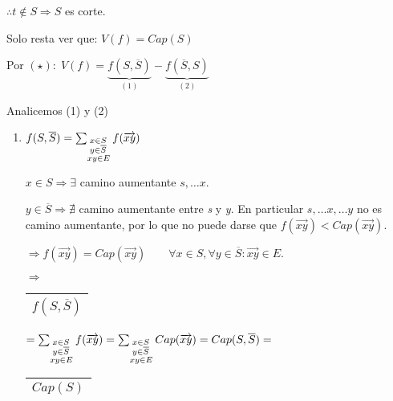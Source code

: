\documentclass[12pt,a4paper]{report}
\begin{document}
				$\therefore t \notin S \Rightarrow S$ es corte.
				
				\begin{center}
					Solo resta ver que: $V(f) = Cap(S)$
				\end{center}
				
				Por $(\star): \; V(f) =  \underbrace{f(S, \overline{S})}_{(1)} - \underbrace{f(\overline{S}, S)}_{(2)}$
				
				\vspace{2mm}
				Analicemos (1) y (2)
			\begin{enumerate}[(1)]
				\item $f(S, \overline{S}) = \sum_{\begin{subarray}{l} \; x \in S\\
\; y \in \overline{S} \\ xy \in E\end{subarray}} f(\overrightarrow{xy}) $

				$x \in S \Rightarrow \exists$ camino aumentante $ s, \dotsc x$.

				$y \in \overline{S} \Rightarrow \nexists$ camino aumentante entre \textit{s} y \textit{y}. En particular $s, 	\dotsc x, \dotsc y$ no es camino aumentante, por lo que no puede darse que $f(\overrightarrow{xy}) < Cap(\overrightarrow{xy})$.
				
				\vspace{3mm}
				$\Rightarrow f(\overrightarrow{xy}) = Cap(\overrightarrow{xy}) \qquad \forall x \in S, \forall y \in \overline{S} : \overrightarrow{xy} \in E.$ 
				
				\vspace{3mm}
				$\Rightarrow$ \begin{tabular}{|c|} \hline $f(S, \overline{S})$ \\ \hline \end{tabular} $= \sum_{\begin{subarray}{l} \; x \in S\\  \; y \in \overline{S} \\ xy \in E\end{subarray}} f(\overrightarrow{xy}) = \sum_{\begin{subarray}{l} \; x \in S\\  \; y \in \overline{S} \\ xy \in E\end{subarray}} Cap(\overrightarrow{xy}) = Cap(S, \overline{S}) =$ \begin{tabular}{|c|} \hline $ Cap(S) $ \\ \hline \end{tabular}


\end{enumerate}
\end{document}
